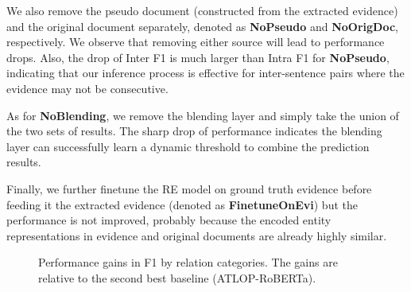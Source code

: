 We also remove the pseudo document (constructed from the extracted evidence) and the original document separately, denoted as \textbf{NoPseudo} and \textbf{NoOrigDoc}, respectively.
We observe that removing either source will lead to performance drops. Also, the drop of Inter F1 is much larger than Intra F1 for \textbf{NoPseudo},
indicating that our inference process is effective for inter-sentence pairs where the evidence may not be consecutive.

As for \textbf{NoBlending}, we remove the blending layer and simply take the union of the two sets of results.
The sharp drop of performance indicates
the blending layer can successfully learn a dynamic threshold to combine the prediction results.

Finally, we further finetune the RE model on ground truth evidence before feeding it the extracted evidence (denoted as \textbf{FinetuneOnEvi}) but the performance is not improved, probably because the encoded entity representations in evidence and original documents are already highly similar.

\begin{table}[!t]
\centering
{}
    \upv
    \caption{Statistics of the 12,323 relations in the DocRED development set.}
    \label{tab:breakdown}
    \downv
\end{table}





\begin{figure}[t]
\centering
{}
    \upv
    \caption{Performance gains in F1 by relation categories. The gains are relative to the second best baseline (ATLOP-RoBERTa).}
    \label{fig:breakdown}
    \downv
    \vspace{-0.17cm}
\end{figure}

\begin{table}[b]
\centering
{}
    \upv
    \caption{Training time and memory usage on DocRED.}
    \label{tab:efficiency}
    \downv
\end{table}

